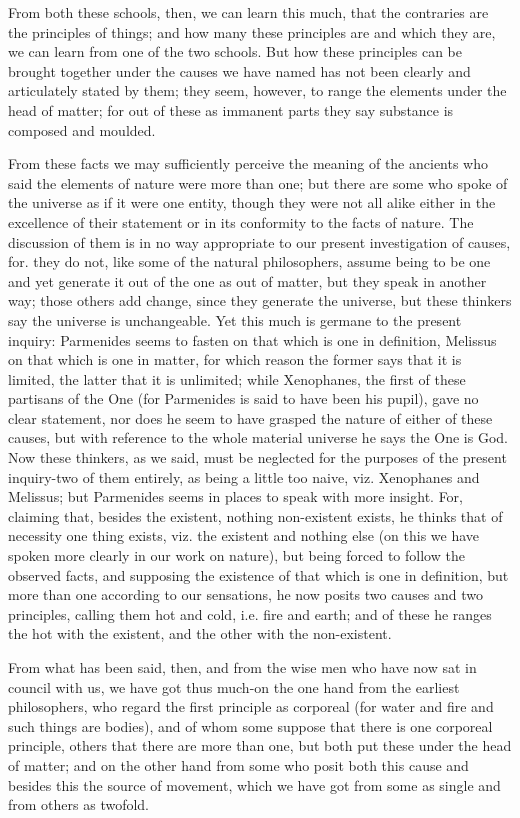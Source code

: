 \documentclass{article}
\begin{document}
From both these schools, then, we can learn this much, that the contraries are the principles of things; and how many these principles are and which they are, we can learn from one of the two schools. But how these principles can be brought together under the causes we have named has not been clearly and articulately stated by them; they seem, however, to range the elements under the head of matter; for out of these as immanent parts they say substance is composed and moulded.

From these facts we may sufficiently perceive the meaning of the ancients who said the elements of nature were more than one; but there are some who spoke of the universe as if it were one entity, though they were not all alike either in the excellence of their statement or in its conformity to the facts of nature. The discussion of them is in no way appropriate to our present investigation of causes, for. they do not, like some of the natural philosophers, assume being to be one and yet generate it out of the one as out of matter, but they speak in another way; those others add change, since they generate the universe, but these thinkers say the universe is unchangeable. Yet this much is germane to the present inquiry: Parmenides seems to fasten on that which is one in definition, Melissus on that which is one in matter, for which reason the former says that it is limited, the latter that it is unlimited; while Xenophanes, the first of these partisans of the One (for Parmenides is said to have been his pupil), gave no clear statement, nor does he seem to have grasped the nature of either of these causes, but with reference to the whole material universe he says the One is God. Now these thinkers, as we said, must be neglected for the purposes of the present inquiry-two of them entirely, as being a little too naive, viz. Xenophanes and Melissus; but Parmenides seems in places to speak with more insight. For, claiming that, besides the existent, nothing non-existent exists, he thinks that of necessity one thing exists, viz. the existent and nothing else (on this we have spoken more clearly in our work on nature), but being forced to follow the observed facts, and supposing the existence of that which is one in definition, but more than one according to our sensations, he now posits two causes and two principles, calling them hot and cold, i.e. fire and earth; and of these he ranges the hot with the existent, and the other with the non-existent.

From what has been said, then, and from the wise men who have now sat in council with us, we have got thus much-on the one hand from the earliest philosophers, who regard the first principle as corporeal (for water and fire and such things are bodies), and of whom some suppose that there is one corporeal principle, others that there are more than one, but both put these under the head of matter; and on the other hand from some who posit both this cause and besides this the source of movement, which we have got from some as single and from others as twofold.
\end{document}
